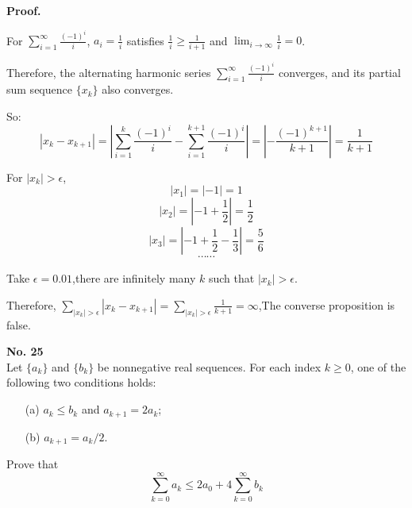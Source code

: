 \documentclass[a4paper, 11pt]{article}
\newenvironment{problem}[2][No.]
    { \begin{mdframed}[backgroundcolor=gray!5] \textbf{#1 #2} \\}
    {  \end{mdframed}}
\newenvironment{solution}
    {\textbf{Proof.}}
    {}
\begin{document}
\begin{solution}

For \(\sum_{i = 1}^{\infty} \frac{(-1)^i}{i}\), \(a_i = \frac{1}{i}\) satisfies \(\frac{1}{i} \geq \frac{1}{i + 1}\) and \(\lim_{i \to \infty} \frac{1}{i} = 0\). 

Therefore, the alternating harmonic series \(\sum_{i = 1}^{\infty} \frac{(-1)^i}{i}\) converges, and its partial sum sequence \(\{x_k\}\) also converges. 
	
So:
$$
|x_k - x_{k + 1}| = \left| \sum_{i = 1}^k \frac{(-1)^i}{i} - \sum_{i = 1}^{k + 1} \frac{(-1)^i}{i} \right| = \left| -\frac{(-1)^{k + 1}}{k + 1} \right| = \frac{1}{k + 1}
$$

For \(|x_k| > \epsilon\),
$$
|x_1| = | - 1| = 1
$$
$$
|x_2| = | - 1 + \frac{1}{2}| =\frac{1}{2}
$$
$$
|x_3| = | - 1 + \frac{1}{2} -\frac{1}{3}| = \frac{5}{6}
$$
$$
\cdots\cdots
$$

Take \(\epsilon = 0.01\),there are infinitely many \(k\) such that \(|x_k| > \epsilon\).

Therefore, \(\sum_{|x_k| > \epsilon} |x_k - x_{k + 1}| = \sum_{|x_k| > \epsilon} \frac{1}{k + 1} = \infty\),The converse proposition is false.
\end{solution}
\begin{problem}{25}
Let $\{a_k\}$ and $\{b_k\}$ be nonnegative real sequences. For each index $k \geq 0$, one of the following two conditions holds:
\begin{itemize}
	\item[(a)] $a_k \leq b_k$ and $a_{k + 1} = 2a_k$;
	\item[(b)] $a_{k + 1} = a_k / 2$.
\end{itemize}
Prove that
$$
\sum_{k = 0}^{\infty} a_k \leq 2a_0 + 4\sum_{k = 0}^{\infty} b_k
$$
\end{problem}
\end{document}
